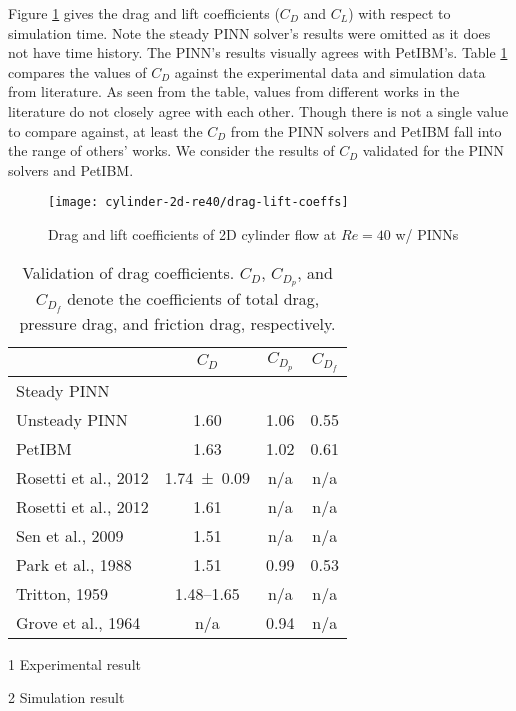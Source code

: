 Figure \ref{fig:cylinder-re40-drag-lift} gives the drag and lift coefficients ($C_D$ and $C_L$) with respect to simulation time.
Note the steady PINN solver's results were omitted as it does not have time history.
The PINN's results visually agrees with PetIBM's.
Table \ref{table:cylinder-re40-cd-comparison} compares the values of $C_D$ against the experimental data and simulation data from literature.
As seen from the table, values from different works in the literature do not closely agree with each other.
Though there is not a single value to compare against, at least the $C_D$ from the PINN solvers and PetIBM fall into the range of others' works.
We consider the results of $C_D$ validated for the PINN solvers and PetIBM.

\begin{figure}
    \centering%
    \texttt{[image: cylinder-2d-re40/drag-lift-coeffs]}%
    \caption{%
        Drag and lift coefficients of 2D cylinder flow at $Re=\num{40}$ w/ PINNs
    }
    \label{fig:cylinder-re40-drag-lift}%
\end{figure}

\begin{table}
    \centering%
    \begin{threeparttable}[b]
        \begin{tabular}{lccc}
            \toprule
            & $C_D$ & $C_{D_p}$ & $C_{D_f}$ \\
            \midrule
            Steady PINN &  &  &  \\
            Unsteady PINN & 1.60 & 1.06 & 0.55 \\
            PetIBM & 1.63 & 1.02 & 0.61 \\
            Rosetti et al., 2012\cite{rosetti_urans_2012}\tnote{1} & \num{1.74+-0.09} & n/a & n/a \\
            Rosetti et al., 2012\cite{rosetti_urans_2012}\tnote{2} & 1.61 & n/a & n/a \\
            Sen et al., 2009\cite{sen_steady_2009}\tnote{2} & 1.51 & n/a & n/a \\
            Park et al., 1988\cite{park_numerical_1998}\tnote{2} & 1.51 & 0.99 & 0.53 \\
            Tritton, 1959\cite{tritton_experiments_1959}\tnote{1} & 1.48--1.65 & n/a & n/a \\
            Grove et al., 1964\cite{grove_experimental_1964}\tnote{1} & n/a & 0.94 & n/a \\
            \bottomrule
        \end{tabular}%
        \begin{tablenotes}
            \footnotesize
            \item [1] Experimental result
            \item [2] Simulation result
        \end{tablenotes}
        \caption{%
            Validation of drag coefficients.%
            $C_D$, $C_{D_p}$, and $C_{D_f}$ denote the coefficients of total drag, pressure drag, %
            and friction drag, respectively.%
        }%
        \label{table:cylinder-re40-cd-comparison}
    \end{threeparttable}
\end{table}%


